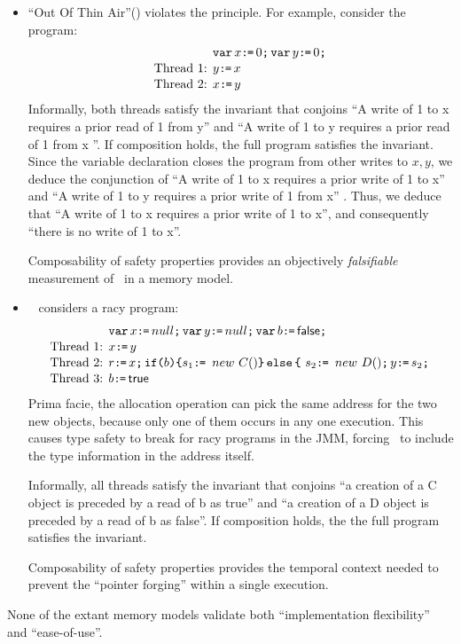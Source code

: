 \begin{itemize}
\item ``Out Of Thin Air''(\oota)  violates the principle.  For example, consider the program:
\begin{align*}
& \texttt{var}\, x\texttt{:}\mkern-1mu\texttt{=}\,0\texttt{;}\, \texttt{var}\, y\texttt{:}\mkern-1mu\texttt{=}\,0\texttt{;}\,  \\[-.5ex]
\mbox{Thread 1: } & y\texttt{:}\mkern-1mu\texttt{=}\, x \\[-.5ex]
\mbox{Thread 2: } & x \texttt{:}\mkern-1mu\texttt{=}\, y
\end{align*}
Informally, both threads satisfy the invariant that conjoins ``A write of 1  to x  requires a prior read  of 1 from y'' and ``A write of 1  to y  requires a prior read  of 1 from x ''.  If composition holds, the full program satisfies the invariant.  Since the variable declaration closes the program from other writes to $x,y$, we  deduce the conjunction of  ``A write of 1  to x  requires a prior write  of 1 to x'' and ``A write of 1  to y  requires a prior write  of 1 from x'' . Thus, we deduce that ``A write of 1  to x  requires a prior write  of 1 to x'', and consequently ``there is no write of 1 to x''. 

Composability  of safety properties provides an  objectively {\em falsifiable} measurement of \oota\ in a memory model. 

\item   ~\citet{DBLP:journals/toplas/Lochbihler13} considers a racy program:
\begin{align*}
& \VAR x\GETS null \SEMI \VAR y\GETS null  \SEMI \VAR b\GETS \FALSE \SEMI  \\[-.5ex]
\mbox{Thread 1: } & x \GETS y \\[-.5ex]
\mbox{Thread 2: } & \aReg\GETS x \SEMI \IF{b} \THEN \bReg_1 \GETS\ new \ C()  \ELSE\ \bReg_2 \GETS\ new \ D()    \SEMI y \GETS \bReg_2 \SEMI \\[-.5ex]
\mbox{Thread 3: } & b \GETS \TRUE
\end{align*}
Prima facie, the allocation operation can pick the same address for the two new objects, because only one of them occurs in any one execution.   This causes type safety to break for racy programs in the JMM, forcing~\citet{Lochbihler13} to include the type information in the address itself.

Informally, all threads satisfy the invariant that conjoins ``a creation of a C object is preceded by a read of b as true'' and ``a creation of a D object is preceded by a read of b as false''.  If composition holds, the the full program satisfies the invariant.   

Composability of safety properties provides the temporal context needed to prevent the ``pointer forging''  within a single execution.  
\end{itemize}
None of the extant memory models validate both ``implementation flexibility'' and ``ease-of-use''.  

